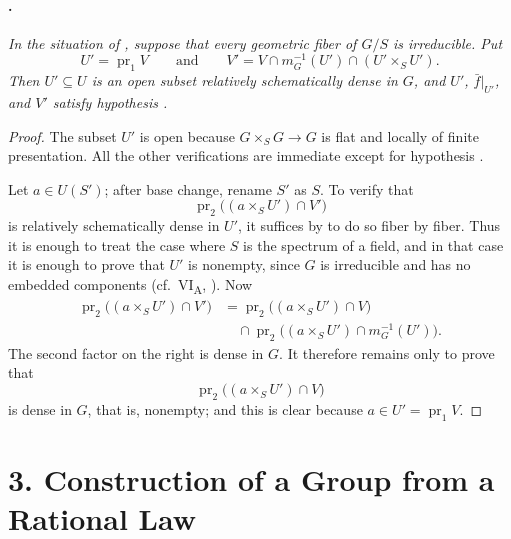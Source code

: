 \paragraph{.}
\textit{In the situation of , suppose that every geometric fiber
of \(G/S\) is irreducible. Put
\[
  U'=\operatorname{pr}_1V
  \qquad\text{and}\qquad
  V'=V\cap m_G^{-1}(U')\cap(U'\times_S U').
\]
Then \(U'\subseteq U\) is an open subset relatively schematically
dense in \(G\), and \(U'\), \(\bar f|_{U'}\), and \(V'\) satisfy
hypothesis \textup{}.}

\begin{proof}
The subset \(U'\) is open because
\(G\times_S G\to G\) is flat and locally of finite presentation.
All the other verifications are immediate except for hypothesis
\textup{}.

Let \(a\in U(S')\); after base change, rename \(S'\) as \(S\). To
verify that
\[
  \operatorname{pr}_2\bigl((a\times_S U')\cap V'\bigr)
\]
is relatively schematically dense in \(U'\), it suffices by
 to do so fiber by fiber. Thus it is enough to treat the
case where \(S\) is the spectrum of a field, and in that case it is
enough to prove that \(U'\) is nonempty, since \(G\) is irreducible
and has no embedded components (cf.\ VI\textsubscript{A}, ).
Now
\[
\begin{aligned}
  \operatorname{pr}_2\bigl((a\times_S U')\cap V'\bigr)
  &=
  \operatorname{pr}_2\bigl((a\times_S U')\cap V\bigr)\\
  &\quad{}\cap
  \operatorname{pr}_2\bigl((a\times_S U')\cap m_G^{-1}(U')\bigr).
\end{aligned}
\]
The second factor on the right is dense in \(G\). It therefore
remains only to prove that
\[
  \operatorname{pr}_2\bigl((a\times_S U')\cap V\bigr)
\]
is dense in \(G\), that is, nonempty; and this is clear because
\(a\in U'=\operatorname{pr}_1V\).
\end{proof}


\section*{3. Construction of a
Group from a Rational Law}

